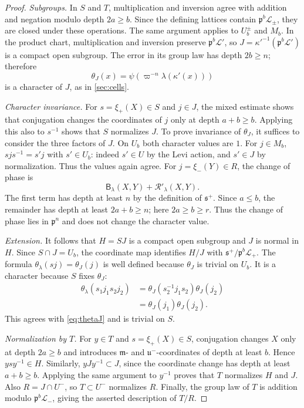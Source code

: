 \documentclass[11pt,reqno]{amsart}
\numberwithin{equation}{section}
\theoremstyle{plain}
\theoremstyle{definition}
\theoremstyle{remark}
\theoremstyle{plain}
\newcommand{\pp}{\mathfrak{p}}   %
\newcommand{\Lat}{\mathcal{L}}   %
\newcommand{\g}{\mathfrak{g}}    %
\newcommand{\uu}{\mathfrak{u}}   %
\newcommand{\m}{\mathfrak{m}}    %
\newcommand{\sS}{\mathfrak{s}^+}   %
\newcommand{\lf}{\lambda}
\newcommand{\Bf}{\mathsf{B}}
\begin{document}
\begin{proof}
\emph{Subgroups.}
In $S$ and $T$, multiplication and inversion agree with addition and
negation modulo depth $2a\ge b$. Since the defining lattices
contain $\pp^b\Lat_\pm$, they are closed under these operations.
The same argument applies to $U_b^\pm$ and $M_b$. In the product
chart, multiplication and inversion preserve $\pp^b\Lat'$,
so $J=\kappa'^{-1}(\pp^b\Lat')$ is a compact open subgroup.
The error in its group law has depth $2b\ge n$; therefore
\[
\theta_J(x)=\psi(\varpi^{-n}\lf(\kappa'(x)))
\]
is a character of $J$, as in \cref{sec:cells}.

\smallskip\noindent\emph{Character invariance.}
For $s=\xi_+(X)\in S$ and $j\in J$, the mixed estimate shows that
conjugation changes the coordinates of $j$ only at depth
$a+b\ge b$. Applying this also to $s^{-1}$ shows that $S$
normalizes $J$. To prove invariance of $\theta_J$, it suffices to
consider the three factors of $J$.
On $U_b$ both character values are $1$. For $j\in M_b$,
$sjs^{-1}=s'j$ with $s'\in U_b$: indeed $s'\in U$ by the Levi
action, and $s'\in J$ by normalization. Thus the values again agree.
For $j=\xi_-(Y)\in R$, the change of phase is
\[
\Bf_\lf(X,Y)+\mathscr R'_\lf(X,Y).
\]
The first term has depth at least $n$ by the definition of $\sS$.
Since $a\le b$, the remainder has depth at least
$2a+b\ge n$; here $2a\ge b\ge r$. Thus the change of phase lies in $\pp^n$
and does not change the character value.

\smallskip\noindent\emph{Extension.}
It follows that $H=SJ$ is a compact open subgroup and $J$ is normal
in $H$. Since $S\cap J=U_b$, the coordinate map identifies
$H/J$ with $\sS/\pp^b\Lat_+$. The formula
$\theta_\lf(sj)=\theta_J(j)$ is well defined because $\theta_J$
is trivial on $U_b$. It is a character because $S$ fixes $\theta_J$:
\[
\begin{aligned}
\theta_\lf(s_1j_1s_2j_2)
&=\theta_J(s_2^{-1}j_1s_2)\theta_J(j_2)\\
&=\theta_J(j_1)\theta_J(j_2).
\end{aligned}
\]
This agrees with \eqref{eq:thetaJ} and is trivial on $S$.

\smallskip\noindent\emph{Normalization by $T$.}
For $y\in T$ and $s=\xi_+(X)\in S$, conjugation changes $X$ only
at depth $2a\ge b$ and introduces $\m$- and $\uu^-$-coordinates
of depth at least $b$. Hence $ysy^{-1}\in H$. Similarly,
$yJy^{-1}\subset J$, since the coordinate change has depth at least
$a+b\ge b$. Applying the same argument to $y^{-1}$ proves that
$T$ normalizes $H$ and $J$. Also $R=J\cap U^-$, so $T\subset U^-$
normalizes $R$. Finally, the group law of $T$ is addition modulo
$\pp^b\Lat_-$, giving the asserted description of $T/R$.
\end{proof}
\end{document}
